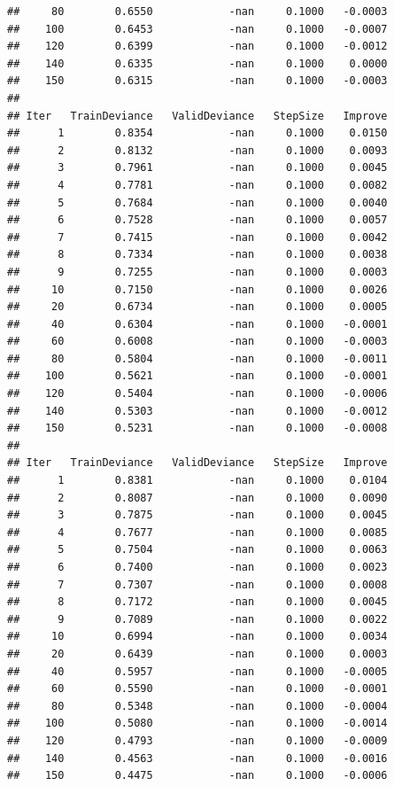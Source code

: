 \documentclass[
]{book}
\begin{document}
\begin{verbatim}
##     80        0.6550            -nan     0.1000   -0.0003
##    100        0.6453            -nan     0.1000   -0.0007
##    120        0.6399            -nan     0.1000   -0.0012
##    140        0.6335            -nan     0.1000    0.0000
##    150        0.6315            -nan     0.1000   -0.0003
## 
## Iter   TrainDeviance   ValidDeviance   StepSize   Improve
##      1        0.8354            -nan     0.1000    0.0150
##      2        0.8132            -nan     0.1000    0.0093
##      3        0.7961            -nan     0.1000    0.0045
##      4        0.7781            -nan     0.1000    0.0082
##      5        0.7684            -nan     0.1000    0.0040
##      6        0.7528            -nan     0.1000    0.0057
##      7        0.7415            -nan     0.1000    0.0042
##      8        0.7334            -nan     0.1000    0.0038
##      9        0.7255            -nan     0.1000    0.0003
##     10        0.7150            -nan     0.1000    0.0026
##     20        0.6734            -nan     0.1000    0.0005
##     40        0.6304            -nan     0.1000   -0.0001
##     60        0.6008            -nan     0.1000   -0.0003
##     80        0.5804            -nan     0.1000   -0.0011
##    100        0.5621            -nan     0.1000   -0.0001
##    120        0.5404            -nan     0.1000   -0.0006
##    140        0.5303            -nan     0.1000   -0.0012
##    150        0.5231            -nan     0.1000   -0.0008
## 
## Iter   TrainDeviance   ValidDeviance   StepSize   Improve
##      1        0.8381            -nan     0.1000    0.0104
##      2        0.8087            -nan     0.1000    0.0090
##      3        0.7875            -nan     0.1000    0.0045
##      4        0.7677            -nan     0.1000    0.0085
##      5        0.7504            -nan     0.1000    0.0063
##      6        0.7400            -nan     0.1000    0.0023
##      7        0.7307            -nan     0.1000    0.0008
##      8        0.7172            -nan     0.1000    0.0045
##      9        0.7089            -nan     0.1000    0.0022
##     10        0.6994            -nan     0.1000    0.0034
##     20        0.6439            -nan     0.1000    0.0003
##     40        0.5957            -nan     0.1000   -0.0005
##     60        0.5590            -nan     0.1000   -0.0001
##     80        0.5348            -nan     0.1000   -0.0004
##    100        0.5080            -nan     0.1000   -0.0014
##    120        0.4793            -nan     0.1000   -0.0009
##    140        0.4563            -nan     0.1000   -0.0016
##    150        0.4475            -nan     0.1000   -0.0006

\end{verbatim}
\end{document}
